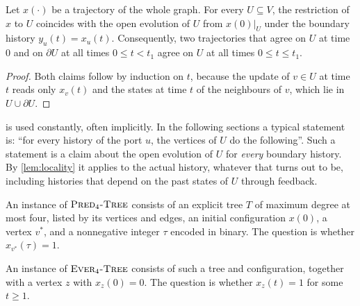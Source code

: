 \begin{lemma}[Locality]\label{lem:locality}
Let $x(\cdot)$ be a trajectory of the whole graph. For every $U\subseteq V$, the restriction of $x$
to $U$ coincides with the open evolution of $U$ from $x(0)|_U$ under the boundary history
$y_u(t)=x_u(t)$. Consequently, two trajectories that agree on $U$ at time $0$ and on $\partial U$ at
all times $0\le t<t_1$ agree on $U$ at all times $0\le t\le t_1$.
\end{lemma}

\begin{proof}
Both claims follow by induction on $t$, because the update of $v\in U$ at time $t$ reads only
$x_v(t)$ and the states at time $t$ of the neighbours of $v$, which lie in $U\cup\partial U$.
\end{proof}

 is used constantly, often implicitly. In the following sections a typical
statement is: ``for every history of the port $u$, the vertices of $U$ do the following''. Such a
statement is a claim about the open evolution of $U$ for \emph{every} boundary history. By
\cref{lem:locality} it applies to the actual history, whatever that turns out to be, including
histories that depend on the past states of $U$ through feedback.

\begin{definition}\label{def:problems}
An instance of $\textsc{Pred}_4\textsc{-Tree}$ consists of an explicit tree $T$ of maximum degree at most four, listed by
its vertices and edges, an initial configuration $x(0)$, a vertex $v^\ast$, and a nonnegative
integer $\tau$ encoded in binary. The question is whether $x_{v^\ast}(\tau)=1$.

An instance of $\textsc{Ever}_4\textsc{-Tree}$ consists of such a tree and configuration, together with a vertex $z$ with
$x_z(0)=0$. The question is whether $x_z(t)=1$ for some $t\ge 1$.
\end{definition}
